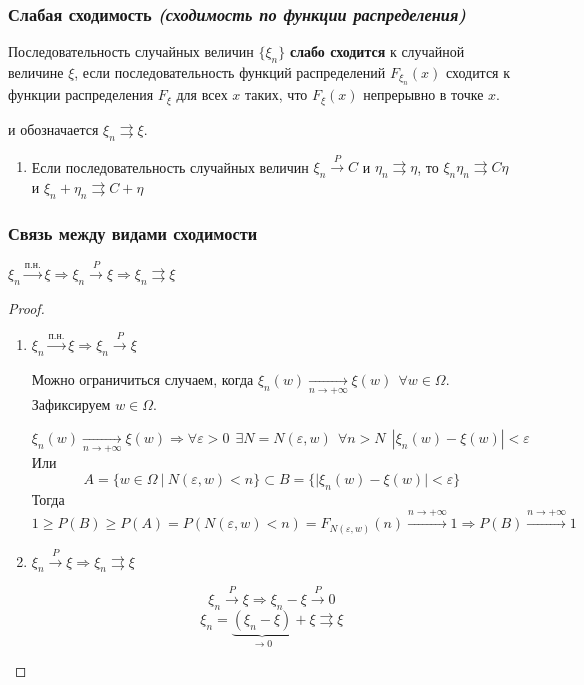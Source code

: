 \subsubsection{Слабая сходимость \textit{(сходимость по функции распределения)}}

\begin{definition}
    Последовательность случайных величин \(\{\xi_n\}\) \textbf{слабо сходится} к случайной величине \(\xi\), если последовательность функций распределений \(F_{\xi_n}(x)\) сходится к функции распределения \(F_\xi\) для всех \(x\) таких, что \(F_\xi(x)\) непрерывно в точке \(x\).

    и обозначается \(\xi_n \rightrightarrows \xi\).
\end{definition}

\begin{prop}\itemfix
    \begin{enumerate}
        \item Если последовательность случайных величин \(\xi_n \xrightarrow{P} C\) и \(\eta_n \rightrightarrows \eta\), то \(\xi_n \eta_n \rightrightarrows C \eta\) и \(\xi_n + \eta_n \rightrightarrows C + \eta\)
    \end{enumerate}
\end{prop}

\subsubsection{Связь между видами сходимости}

\begin{theorem}
    \(\xi_n \xrightarrow{\text{п.н.}} \xi \Rightarrow \xi_n \xrightarrow{P} \xi \Rightarrow \xi_n \rightrightarrows \xi\)
\end{theorem}
\begin{proof}\itemfix
    \begin{enumerate}
        \item \(\xi_n \xrightarrow{\text{п.н.}} \xi \Rightarrow \xi_n \xrightarrow{P} \xi\)

              Можно ограничиться случаем, когда \(\xi_n(w) \xrightarrow[n \to +\infty]{} \xi(w) \ \ \forall w\in \Omega\). Зафиксируем \(w \in \Omega\).

              \[\xi_n(w) \xrightarrow[n \to +\infty]{} \xi(w) \Rightarrow \forall \varepsilon > 0 \ \ \exists N = N(\varepsilon, w) \ \ \forall n > N \ \ |\xi_n(w) - \xi(w)| < \varepsilon\]
              Или
              \[A = \{w \in \Omega\ |\ N(\varepsilon, w) < n\} \subset B = \{|\xi_n(w) - \xi(w)|< \varepsilon\}\]
              Тогда
              \[1 \geq P(B) \geq P(A) = P(N(\varepsilon, w) < n) = F_{N(\varepsilon, w)}(n) \xrightarrow{n \to +\infty} 1 \Rightarrow P(B) \xrightarrow{n \to +\infty} 1\]

        \item \(\xi_n \xrightarrow{P} \xi \Rightarrow \xi_n \rightrightarrows \xi\)

              \[\xi_n \xrightarrow{P} \xi \Rightarrow \xi_n - \xi \xrightarrow{P} 0\]
              \[\xi_n = \underbrace{(\xi_n - \xi)}_{ \to 0} + \xi \rightrightarrows \xi\]
    \end{enumerate}
\end{proof}

